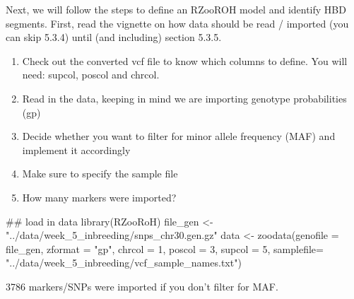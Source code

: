 \documentclass[
  letterpaper,
  DIV=11,
  numbers=noendperiod]{scrreprt}
\newenvironment{Shaded}{}{}
\newcommand{\AttributeTok}[1]{\textcolor[rgb]{0.84,0.23,0.29}{#1}}
\newcommand{\DecValTok}[1]{\textcolor[rgb]{0.00,0.36,0.77}{#1}}
\newcommand{\DocumentationTok}[1]{\textcolor[rgb]{0.42,0.45,0.49}{#1}}
\newcommand{\FunctionTok}[1]{\textcolor[rgb]{0.44,0.26,0.76}{#1}}
\newcommand{\NormalTok}[1]{\textcolor[rgb]{0.14,0.16,0.18}{#1}}
\newcommand{\OtherTok}[1]{\textcolor[rgb]{0.44,0.26,0.76}{#1}}
\newcommand{\StringTok}[1]{\textcolor[rgb]{0.01,0.18,0.38}{#1}}
\providecommand{\tightlist}{%
  \setlength{\itemsep}{0pt}\setlength{\parskip}{0pt}}\usepackage{longtable,booktabs,array}
\begin{document}
Next, we will follow the steps to define an RZooROH model and identify
HBD segments. First, read the vignette on how data should be read /
imported (you can skip 5.3.4) until (and including) section 5.3.5.

\begin{enumerate}
\def\labelenumi{\arabic{enumi}.}
\tightlist
\item
  Check out the converted vcf file to know which columns to define. You
  will need: supcol, poscol and chrcol.
\item
  Read in the data, keeping in mind we are importing genotype
  probabilities (gp)
\item
  Decide whether you want to filter for minor allele frequency (MAF) and
  implement it accordingly
\item
  Make sure to specify the sample file
\item
  How many markers were imported?
\end{enumerate}

\begin{tcolorbox}[enhanced jigsaw, arc=.35mm, left=2mm, titlerule=0mm, rightrule=.15mm, colframe=quarto-callout-tip-color-frame, coltitle=black, colback=white, opacityback=0, bottomtitle=1mm, bottomrule=.15mm, colbacktitle=quarto-callout-tip-color!10!white, breakable, title=\textcolor{quarto-callout-tip-color}{\faLightbulb}\hspace{0.5em}{Code and answer}, toptitle=1mm, toprule=.15mm, opacitybacktitle=0.6, leftrule=.75mm]

\begin{Shaded}
\begin{Highlighting}[]
\DocumentationTok{\#\# load in data}
\FunctionTok{library}\NormalTok{(RZooRoH)}
\NormalTok{file\_gen }\OtherTok{\textless{}{-}} \StringTok{"../data/week\_5\_inbreeding/snps\_chr30.gen.gz"}
\NormalTok{data }\OtherTok{\textless{}{-}} \FunctionTok{zoodata}\NormalTok{(}\AttributeTok{genofile =}\NormalTok{ file\_gen, }\AttributeTok{zformat =} \StringTok{"gp"}\NormalTok{, }\AttributeTok{chrcol =} \DecValTok{1}\NormalTok{, }\AttributeTok{poscol =} \DecValTok{3}\NormalTok{, }\AttributeTok{supcol =} \DecValTok{5}\NormalTok{, }\AttributeTok{samplefile=} \StringTok{"../data/week\_5\_inbreeding/vcf\_sample\_names.txt"}\NormalTok{)}
\end{Highlighting}
\end{Shaded}

3786 markers/SNPs were imported if you don't filter for MAF.

\end{tcolorbox}
\end{document}
